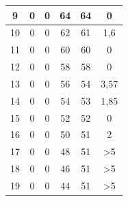 \begin{longtable}{|c|c|c|c|c|c|}
	9                                            & 0                      & 0                     & 64                    & 64                     & 0                                                  \\ \hline
	10                                           & 0                      & 0                     & 62                    & 61                     & 1,6                                        \\ \hline
	11                                           & 0                      & 0                     & 60                    & 60                     & 0                                                  \\ \hline
	12                                           & 0                      & 0                     & 58                    & 58                     & 0                                                  \\ \hline
	13                                           & 0                      & 0                     & 56                    & 54                     & 3,57                                      \\ \hline
	14                                           & 0                      & 0                     & 54                    & 53                     & 1,85                                       \\ \hline
	15                                           & 0                      & 0                     & 52                    & 52                     & 0                                                  \\ \hline
	16                                           & 0                      & 0                     & 50                    & 51                     & 2                                                  \\ \hline
	17                                           & 0                      & 0                     & 48                    & 51                     & >5                                               \\ \hline
	18                                           & 0                      & 0                     & 46                    & 51                     & >5                                        \\ \hline
	19                                           & 0                      & 0                     & 44                    & 51                     & >5                                        \\ \hline

\end{longtable}
